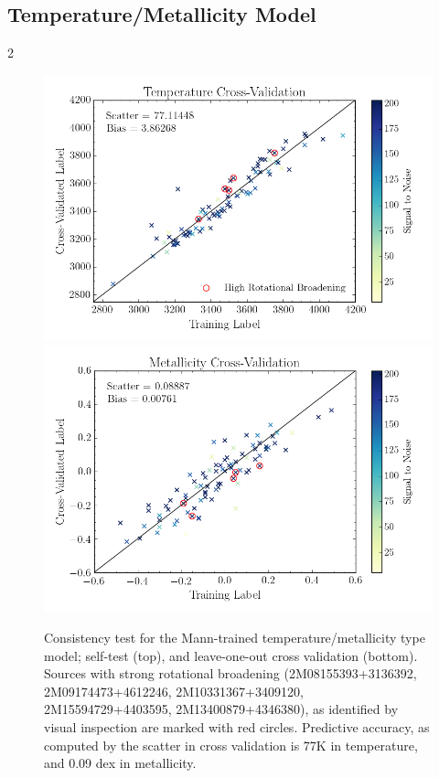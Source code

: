 \documentclass[twocolumn]{aastex62}
\begin{document}
\subsection{Temperature/Metallicity Model \label{subsec:mann_results}}
2
\begin{figure}
	\includegraphics[width=\linewidth]{crv_test_teff.png}
	\includegraphics[width=\linewidth]{crv_test_fe_h.png}
	\caption{Consistency test for the Mann-trained temperature/metallicity type model; self-test (top), and leave-one-out cross validation (bottom). Sources with strong rotational broadening (2M08155393+3136392, 2M09174473+4612246, 2M10331367+3409120, 2M15594729+4403595, 2M13400879+4346380), as identified by visual inspection are marked with red circles. Predictive accuracy, as computed by the scatter in cross validation is 77K in temperature, and 0.09 dex in metallicity.} 
	\label{fig:mann_validation}
\end{figure}
\end{document}
